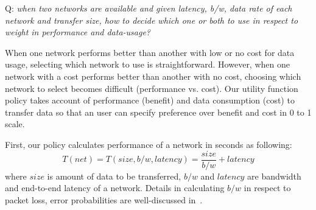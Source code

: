 \documentclass[12pt]{article}
\date{}
\begin{document}
% 
\thispagestyle{empty}
\onecolumn
\setlength\parindent{0pt}
\nocite{*}

Q: {\it when two networks are available and given latency, b/w, data rate of each
network and transfer size, how to decide which one or both to use in respect to
weight in performance and data-usage? }
\newline

When one network performs better than another with low or no cost for data
usage, selecting which network to use is straightforward. However, when one
network with a cost performs better than another with no cost, choosing which
network to select becomes difficult (performance vs. cost).
Our utility function policy takes account of performance (benefit) and data
consumption (cost) to transfer data so that an user can specify preference over
benefit and cost in 0 to 1 scale.
\newline

First, our policy calculates performance of a network in seconds as following:
$$T(net)=T(size, b/w, latency) = \frac{size}{b/w}+latency$$ 
where $size$ is amount of data to be transferred, $b/w$ and $latency$ are
bandwidth and end-to-end latency of a network. 
Details in calculating $b/w$ in respect to packet loss, error probabilities are
well-discussed in~\cite{macroscopic}.
\end{document}

